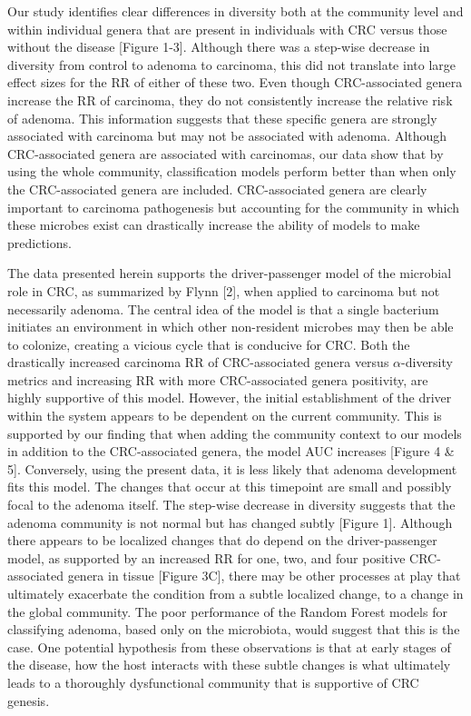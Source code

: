 \documentclass[12pt,]{article}
\begin{document}
Our study identifies clear differences in diversity both at the
community level and within individual genera that are present in
individuals with CRC versus those without the disease {[}Figure 1-3{]}.
Although there was a step-wise decrease in diversity from control to
adenoma to carcinoma, this did not translate into large effect sizes for
the RR of either of these two. Even though CRC-associated genera
increase the RR of carcinoma, they do not consistently increase the
relative risk of adenoma. This information suggests that these specific
genera are strongly associated with carcinoma but may not be associated
with adenoma. Although CRC-associated genera are associated with
carcinomas, our data show that by using the whole community,
classification models perform better than when only the CRC-associated
genera are included. CRC-associated genera are clearly important to
carcinoma pathogenesis but accounting for the community in which these
microbes exist can drastically increase the ability of models to make
predictions.

The data presented herein supports the driver-passenger model of the
microbial role in CRC, as summarized by Flynn {[}2{]}, when applied to
carcinoma but not necessarily adenoma. The central idea of the model is
that a single bacterium initiates an environment in which other
non-resident microbes may then be able to colonize, creating a vicious
cycle that is conducive for CRC. Both the drastically increased
carcinoma RR of CRC-associated genera versus \(\alpha\)-diversity
metrics and increasing RR with more CRC-associated genera positivity,
are highly supportive of this model. However, the initial establishment
of the driver within the system appears to be dependent on the current
community. This is supported by our finding that when adding the
community context to our models in addition to the CRC-associated
genera, the model AUC increases {[}Figure 4 \& 5{]}. Conversely, using
the present data, it is less likely that adenoma development fits this
model. The changes that occur at this timepoint are small and possibly
focal to the adenoma itself. The step-wise decrease in diversity
suggests that the adenoma community is not normal but has changed subtly
{[}Figure 1{]}. Although there appears to be localized changes that do
depend on the driver-passenger model, as supported by an increased RR
for one, two, and four positive CRC-associated genera in tissue
{[}Figure 3C{]}, there may be other processes at play that ultimately
exacerbate the condition from a subtle localized change, to a change in
the global community. The poor performance of the Random Forest models
for classifying adenoma, based only on the microbiota, would suggest
that this is the case. One potential hypothesis from these observations
is that at early stages of the disease, how the host interacts with
these subtle changes is what ultimately leads to a thoroughly
dysfunctional community that is supportive of CRC genesis.
\end{document}
